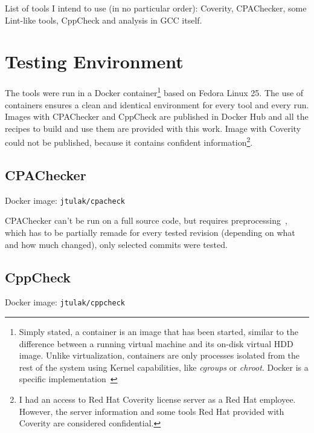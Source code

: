List of tools I intend to use (in no particular order): Coverity,
	CPAChecker, some Lint-like tools, CppCheck and analysis in GCC itself.


\section{Testing Environment}\label{chap:techniques:env}

The tools were run in a Docker container\footnote{Simply stated, a
	container is an image that has been started, similar to the
		difference between a running virtual machine and its
		on-disk virtual HDD image. Unlike virtualization,
		containers are only processes isolated from the rest of the
system using Kernel capabilities, like {\em cgroups} or {\em chroot}.
Docker is a specific implementation~\cite{docker}} based on Fedora Linux
25. The use of containers ensures a clean and identical environment for
every tool and every run. Images with CPAChecker and CppCheck are published
in Docker Hub and all the recipes to build and use them are provided with
this work. Image with Coverity could not be published, because it contains
confident information\footnote{I had an access to Red Hat Coverity license
server as a Red Hat employee. However, the server information and some tools
	Red Hat provided with Coverity are considered confidential. }.

\subsection{CPAChecker}
Docker image: {\tt jtulak/cpacheck}~\cite{dockerCPAChecker}

CPAChecker can't be run on a full source code, but requires
preprocessing~\cite{cpacheckerGettingStarted}, which has to be partially
remade for every tested revision (depending on what and how much changed),
       only selected commits were tested.
\subsection{CppCheck}
Docker image: {\tt jtulak/cppcheck}~\cite{dockerCPPCheck}

